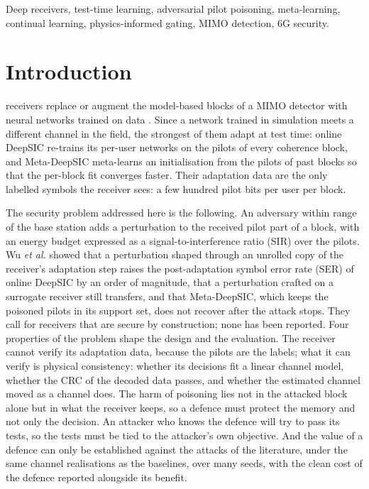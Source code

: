 \documentclass[journal]{IEEEtran}
\begin{document}
\begin{IEEEkeywords}
Deep receivers, test-time learning, adversarial pilot poisoning, meta-learning, continual
learning, physics-informed gating, MIMO detection, 6G security.
\end{IEEEkeywords}

\section{Introduction}
 receivers replace or augment the model-based blocks of a MIMO
detector with neural networks trained on data \cite{oshea2017,honkala2021,samuel2019,
shlezinger2023}. Since a network trained in simulation meets a different channel in the
field, the strongest of them adapt at test time: online DeepSIC \cite{shlezinger2021}
re-trains its per-user networks on the pilots of every coherence block, and Meta-DeepSIC
\cite{raviv2023} meta-learns an initialisation from the pilots of past blocks so that the
per-block fit converges faster. Their adaptation data are the only labelled symbols the
receiver sees: a few hundred pilot bits per user per block.

The security problem addressed here is the following. An adversary within range of the
base station adds a perturbation to the received pilot part of a block, with an energy
budget expressed as a signal-to-interference ratio (SIR) over the pilots. Wu
\emph{et al.} \cite{wu2024} showed that a perturbation shaped through an unrolled copy
of the receiver's adaptation step raises the post-adaptation symbol error rate (SER) of
online DeepSIC by an order of magnitude, that a perturbation crafted on a surrogate
receiver still transfers, and that Meta-DeepSIC, which keeps the poisoned pilots in its
support set, does not recover after the attack stops. They call for receivers that are
secure by construction; none has been reported. Four properties of the problem shape the
design and the evaluation. The receiver cannot verify its adaptation
data, because the pilots are the labels; what it can verify is physical consistency:
whether its decisions fit a linear channel model, whether the CRC of the decoded data
passes, and whether the estimated channel moved as a channel does. The harm of poisoning
lies not in the attacked block alone but in what the receiver keeps, so a defence must
protect the memory and not only the decision. An attacker who knows the defence will try
to pass its tests, so the tests must be tied to the attacker's own objective. And the
value of a defence can only be established against the attacks of the literature, under
the same channel realisations as the baselines, over many seeds, with the clean cost of
the defence reported alongside its benefit.
\end{document}
